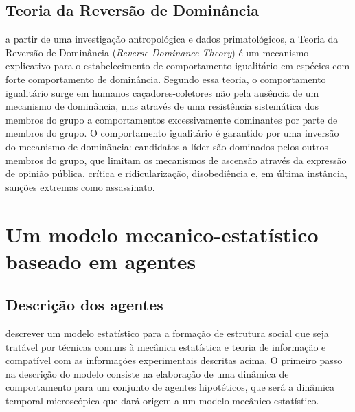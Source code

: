 \subsection{Teoria da Reversão de Dominância}
 a partir de uma investigação antropológica e dados primatológicos, a Teoria da Reversão de Dominância (\textit{Reverse Dominance Theory}) é um mecanismo explicativo para o estabelecimento de comportamento igualitário em espécies com forte comportamento de dominância. Segundo essa teoria, o comportamento igualitário surge em humanos caçadores-coletores não pela ausência de um mecanismo de dominância, mas através de uma resistência sistemática dos membros do grupo a comportamentos excessivamente dominantes por parte de membros do grupo. O comportamento igualitário é garantido por uma inversão do mecanismo de dominância: candidatos a líder são dominados pelos outros membros do grupo, que limitam os mecanismos de ascensão através da expressão de opinião pública, crítica e ridicularização, disobediência e, em última instância, sanções extremas como assassinato\cite{Boehm2001, Boehm1993}.

\section{Um modelo mecanico-estatístico baseado em agentes}
\subsection{Descrição dos agentes}

 descrever um modelo estatístico para a formação de estrutura social que seja tratável por técnicas comuns à mecânica estatística e teoria de informação e compatível com as informações experimentais descritas acima. O primeiro passo na descrição do modelo consiste na elaboração de uma dinâmica de comportamento para um conjunto de agentes hipotéticos, que será a dinâmica temporal microscópica que dará origem a um modelo mecânico-estatístico. 

